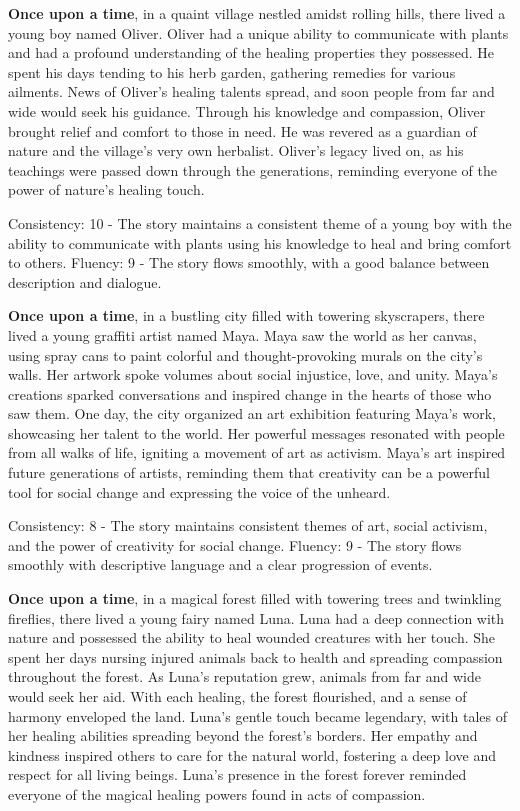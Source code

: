 \documentclass{article}
\begin{document}
\textbf{Once upon a time}, in a quaint village nestled amidst rolling hills, there lived a young boy named Oliver. Oliver had a unique ability to communicate with plants and had a profound understanding of the healing properties they possessed. He spent his days tending to his herb garden, gathering remedies for various ailments. News of Oliver's healing talents spread, and soon people from far and wide would seek his guidance. Through his knowledge and compassion, Oliver brought relief and comfort to those in need. He was revered as a guardian of nature and the village's very own herbalist. Oliver's legacy lived on, as his teachings were passed down through the generations, reminding everyone of the power of nature's healing touch.

Consistency: 10 - The story maintains a consistent theme of a young boy with the ability to communicate with plants using his knowledge to heal and bring comfort to others.
Fluency: 9 - The story flows smoothly, with a good balance between description and dialogue.

\textbf{Once upon a time}, in a bustling city filled with towering skyscrapers, there lived a young graffiti artist named Maya. Maya saw the world as her canvas, using spray cans to paint colorful and thought-provoking murals on the city's walls. Her artwork spoke volumes about social injustice, love, and unity. Maya's creations sparked conversations and inspired change in the hearts of those who saw them. One day, the city organized an art exhibition featuring Maya's work, showcasing her talent to the world. Her powerful messages resonated with people from all walks of life, igniting a movement of art as activism. Maya's art inspired future generations of artists, reminding them that creativity can be a powerful tool for social change and expressing the voice of the unheard.

Consistency: 8 - The story maintains consistent themes of art, social activism, and the power of creativity for social change.
Fluency: 9 - The story flows smoothly with descriptive language and a clear progression of events.

\textbf{Once upon a time}, in a magical forest filled with towering trees and twinkling fireflies, there lived a young fairy named Luna. Luna had a deep connection with nature and possessed the ability to heal wounded creatures with her touch. She spent her days nursing injured animals back to health and spreading compassion throughout the forest. As Luna's reputation grew, animals from far and wide would seek her aid. With each healing, the forest flourished, and a sense of harmony enveloped the land. Luna's gentle touch became legendary, with tales of her healing abilities spreading beyond the forest's borders. Her empathy and kindness inspired others to care for the natural world, fostering a deep love and respect for all living beings. Luna's presence in the forest forever reminded everyone of the magical healing powers found in acts of compassion.
\end{document}
